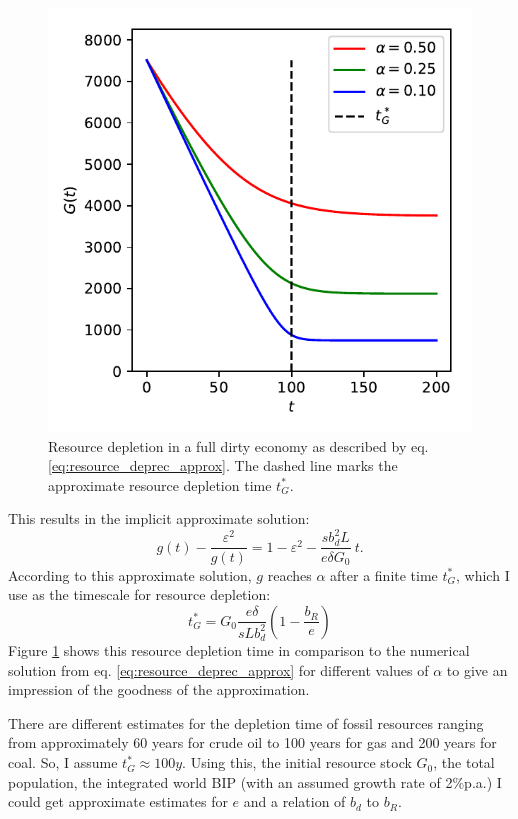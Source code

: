 \begin{figure}
    \vspace{-.8 cm}
    \hspace{-1.5cm}\includegraphics[width = .58 \textwidth]{figures/g_depletion.pdf}
	\caption{Resource depletion in a full dirty economy as described by eq. \eqref{eq:resource_deprec_approx}. The dashed line marks the approximate resource depletion time $t^*_G$. \label{fig:g_depletion}}
\end{figure}

This results in the implicit approximate solution:
\begin{equation}
  g(t) - \frac{\varepsilon^2}{g(t)} = 1 -\varepsilon^2 - \frac{s b_d^2 L}{e \delta G_0} \ t.
	\label{eq:resource_transient_solution2}
\end{equation}
According to this approximate solution, $g$ reaches $\alpha$ after a finite time $t^*_G$, which I use as the timescale for resource depletion:
\begin{equation}
	t^*_G = G_0\frac{e \delta}{s L b_d^2}\left( 1-\frac{b_R}{e} \right)
	\label{eq:resource_depletion_time}
\end{equation}
Figure \ref{fig:g_depletion} shows this resource depletion time in comparison to the numerical solution from eq. \ref{eq:resource_deprec_approx} for different values of $\alpha$ to give an impression of the goodness of the approximation.

There are different estimates for the depletion time of fossil resources ranging from approximately 60 years for crude oil to 100 years for gas and 200 years for coal.
So, I assume $t^*_G \approx 100y$. Using this, the initial resource stock $G_0$, the total population, the integrated world BIP (with an assumed growth rate of 2\%p.a.) I could get approximate estimates for $e$ and a relation of $b_d$ to  $b_R$.

